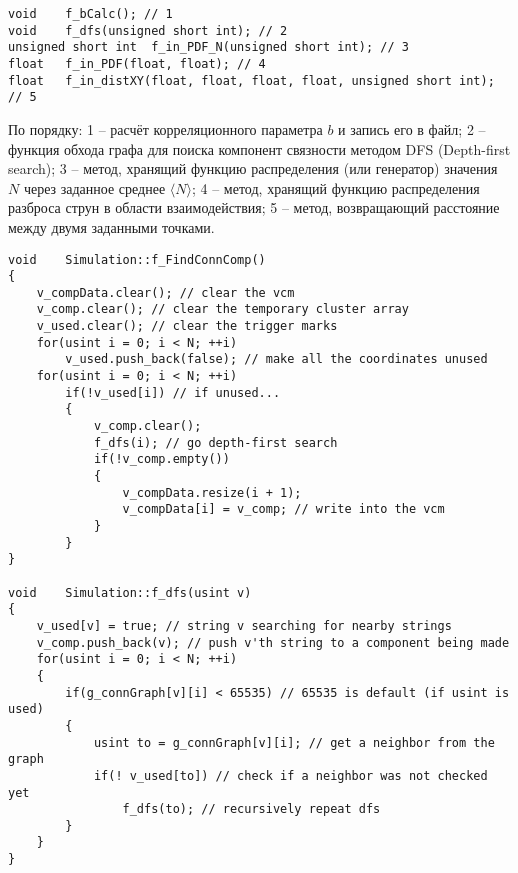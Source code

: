 \begin{lstlisting}
void	f_bCalc(); // 1
void	f_dfs(unsigned short int); // 2	
unsigned short int	f_in_PDF_N(unsigned short int); // 3
float	f_in_PDF(float, float); // 4	
float	f_in_distXY(float, float, float, float, unsigned short int); // 5
\end{lstlisting}
По порядку: 1 -- расчёт корреляционного параметра $b$ и запись его в файл; 2 -- функция обхода графа для поиска компонент связности методом DFS (Depth-first search); 3 -- метод, хранящий функцию распределения (или генератор) значения $N$ через заданное среднее $\langle N \rangle$; 4 -- метод, хранящий функцию распределения разброса струн в области взаимодействия; 5 -- метод, возвращающий расстояние между двумя заданными точками.
\begin{lstlisting}
void	Simulation::f_FindConnComp()
{
    v_compData.clear(); // clear the vcm
    v_comp.clear(); // clear the temporary cluster array
    v_used.clear(); // clear the trigger marks
    for(usint i = 0; i < N; ++i)
		v_used.push_back(false); // make all the coordinates unused
	for(usint i = 0; i < N; ++i)
		if(!v_used[i]) // if unused...
        {
            v_comp.clear();
			f_dfs(i); // go depth-first search
			if(!v_comp.empty())
            {
                v_compData.resize(i + 1);
                v_compData[i] = v_comp; // write into the vcm
            }
		}
}

void	Simulation::f_dfs(usint v)
{
    v_used[v] = true; // string v searching for nearby strings
	v_comp.push_back(v); // push v'th string to a component being made
	for(usint i = 0; i < N; ++i)
	{
	    if(g_connGraph[v][i] < 65535) // 65535 is default (if usint is used)
        {
            usint to = g_connGraph[v][i]; // get a neighbor from the graph
            if(! v_used[to]) // check if a neighbor was not checked yet
                f_dfs(to); // recursively repeat dfs
        }
	}
}
\end{lstlisting}